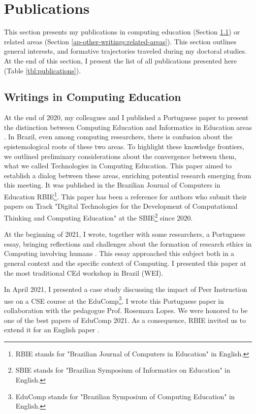 \chapter{Publications}
\label{chap:appendix-a}

This section presents my publications in computing education (Section \ref{ap-other-writings:comp-ed}) or related areas (Section \ref{ap-other-writings:related-areas}). This section outlines general interests, and formative trajectories traveled during my doctoral studies. At the end of this section, I present the list of all publications presented here (Table \ref{tbl:publications}).

\section{Writings in Computing Education}
\label{ap-other-writings:comp-ed}

At the end of 2020, my colleagues and I published a Portuguese paper to present the distinction between Computing Education and Informatics in Education areas \cite{bispojr:2020-tec}. In Brazil, even among computing researchers, there is confusion about the epistemological roots of these two areas. To highlight these knowledge frontiers, we outlined preliminary considerations about the convergence between them, what we called Technologies in Computing Education. This paper aimed to establish a dialog between these areas, enriching potential research emerging from this meeting. It was published in the Brazilian Journal of Computers in Education \gls{RBIE}\footnote{RBIE stands for "Brazilian Journal of Computers in Education" in English.}. This paper has been a reference for authors who submit their papers on Track "Digital Technologies for the Development of Computational Thinking and Computing Education" at the \gls{SBIE}\footnote{SBIE stands for "Brazilian Symposium of Informatics on Education" in English.} since 2020.

At the beginning of 2021, I wrote, together with some researchers, a Portuguese essay, bringing reflections and challenges about the formation of research ethics in Computing involving humans \cite{bispojr:2021-wei}. This essay approached this subject both in a general context and the specific context of Computing. I presented this paper at the most traditional \gls{CEd} workshop in Brazil (\gls{WEI}).

In April 2021, I presented a case study discussing the impact of Peer Instruction use on a \gls{CSE} course \cite{bispojr:2021-educomp} at the \gls{EduComp}\footnote{EduComp stands for "Brazilian Symposium of Computing Education" in English.}. I wrote this Portuguese paper in collaboration with the pedagogue Prof. Rosemara Lopes. We were honored to be one of the best papers of \gls{EduComp} 2021. As a consequence, \gls{RBIE} invited us to extend it for an English paper \cite{bispojr:2021}. 

